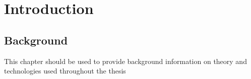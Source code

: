\part{\label{part:intro}Introduction}
\chapter{\label{chp:background}Background}

This chapter should be used to provide background information on theory and technologies used throughout the thesis



\tocless